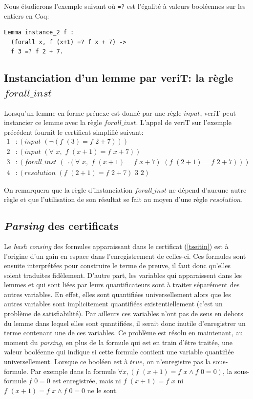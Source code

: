 \documentclass[11pt]{article}
\begin{document}
Nous étudierons l'exemple suivant où \texttt{=?} est l'égalité à valeurs booléennes sur les entiers en Coq: 

\begin{lstlisting}[frame=single]
Lemma instance_2 f : 
  (forall x, f (x+1) =? f x + 7) ->
  f 3 =? f 2 + 7.
\end{lstlisting}


\subsection{Instanciation d'un lemme par veriT: la règle $forall\_inst$}
\label{forall_inst}
Lorsqu'un lemme en forme prénexe est donné par une règle $input$, veriT peut instancier ce lemme avec la règle $forall\_inst$. L'appel de veriT sur l'exemple précédent fournit le certificat simplifié suivant:
\begin{align*}
1&:(input  \,\, (\neg(f \,\,(3) = f\,\,2+7))) \\
2&:(input \,\,(\forall\,\, x,\,\, f\,\, (x+1) = f\,\,x+7)) \\
3&:(forall\_inst \,\,(\neg (\forall\,\, x, \,\,f \,\,(x+1) = f\,\,x+7) \,\,(f \,\,(2+1) = f\,\,2+7)) ) \\
4&:(resolution  \,\, (f \,\,(2+1) = f\,\,2+7) \,\,3 \,\,2) 
\end{align*}

On remarquera que la règle d'instanciation $forall\_inst$ ne dépend d'aucune autre règle et que l'utili\-sation de son résultat se fait au moyen d'une règle $resolution$.

\subsection{\textit{Parsing} des certificats}

Le \textit{hash consing} des formules apparaissant dans le certificat (\ref{tseitin}) est à l'origine d'un gain en espace dans l'enregistrement de celles-ci. Ces formules sont ensuite interprétées pour construire le terme de preuve, il faut donc qu'elles soient traduites fidèlement. D'autre part, les variables qui apparaissent dans les lemmes et qui sont liées par leurs quantificateurs sont à traiter séparément des autres variables. En effet, elles sont quantifiées universellement alors que les autres variables sont implicitement quantifiées existentiellement (c'est un problème de satisfiabilité). Par ailleurs ces variables n'ont pas de sens en dehors du lemme dans lequel elles sont quantifiées, il serait donc inutile d'enregistrer un terme contenant une de ces variables. Ce problème est résolu en maintenant, au moment du \textit{parsing}, en plus de la formule qui est en train d'être traitée, une valeur booléenne qui indique si cette formule contient une variable quantifiée universellement. Lorsque ce booléen est à $true$, on n'enregistre pas la sous-formule. Par exemple dans la formule $\forall x, (f \,\, (x+1) = f \,\, x \wedge f\,\,0 = 0)$, la sous-formule $f \,\, 0 = 0$ est enregistrée, mais ni $f\,\,(x+1) = f\,\,x$ ni $f \,\, (x+1) = f \,\, x \wedge f\,\,0 = 0$ ne le sont.\medbreak
\end{document}
